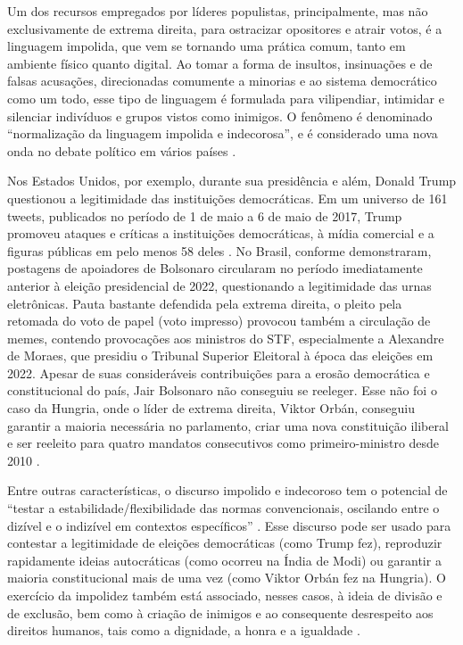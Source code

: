 \documentclass[portuguese]{textolivre}
\begin{document}
Um dos recursos empregados por líderes populistas, principalmente, mas não exclusivamente de extrema direita, para ostracizar opositores e atrair votos, é a linguagem impolida, que vem se tornando uma prática comum, tanto em ambiente físico quanto digital. Ao tomar a forma de insultos, insinuações e de falsas acusações, direcionadas comumente a minorias e ao sistema democrático como um todo, esse tipo de linguagem é formulada para vilipendiar, intimidar e silenciar indivíduos e grupos vistos como inimigos. O fenômeno é denominado “normalização da linguagem impolida e indecorosa”, e é considerado uma nova onda no debate político em vários países \cite{wodak2021culpeper}.

Nos Estados Unidos, por exemplo, durante sua presidência e além, Donald Trump questionou a legitimidade das instituições democráticas. Em um universo de 161 tweets, publicados no período de 1 de maio a 6 de maio de 2017, Trump promoveu ataques e críticas a instituições democráticas, à mídia comercial e a figuras públicas em pelo menos 58 deles \cite{koike2018}. No Brasil, conforme \textcite{oliveira2024} demonstraram, postagens de apoiadores de Bolsonaro circularam no período imediatamente anterior à eleição presidencial de 2022, questionando a legitimidade das urnas eletrônicas. Pauta bastante defendida pela extrema direita, o pleito pela retomada do voto de papel (voto impresso) provocou também a circulação de memes, contendo provocações aos ministros do STF, especialmente a Alexandre de Moraes, que presidiu o Tribunal Superior Eleitoral à época das eleições em 2022. Apesar de suas consideráveis contribuições para a erosão democrática e constitucional do país, Jair Bolsonaro não conseguiu se reeleger. Esse não foi o caso da Hungria, onde o líder de extrema direita, Viktor Orbán, conseguiu garantir a maioria necessária no parlamento, criar uma nova constituição iliberal e ser reeleito para quatro mandatos consecutivos como primeiro-ministro desde 2010 \cite{drinoczi-agnieska2022}.

Entre outras características, o discurso impolido e indecoroso tem o potencial de ``testar a estabilidade/flexibilidade das normas convencionais, oscilando entre o dizível e o indizível em contextos específicos'' \cite[p. 388]{wodak2021culpeper}. Esse discurso pode ser usado para contestar a legitimidade de eleições democráticas (como Trump fez), reproduzir rapidamente ideias autocráticas (como ocorreu na Índia de Modi) ou garantir a maioria constitucional mais de uma vez (como Viktor Orbán fez na Hungria). O exercício da impolidez também está associado, nesses casos, à ideia de divisão e de exclusão, bem como à criação de inimigos e ao consequente desrespeito aos direitos humanos, tais como a dignidade, a honra e a igualdade \cite{andrade2019, drinoczi-agnieska2022, drinoczi2022}.  
\end{document}
